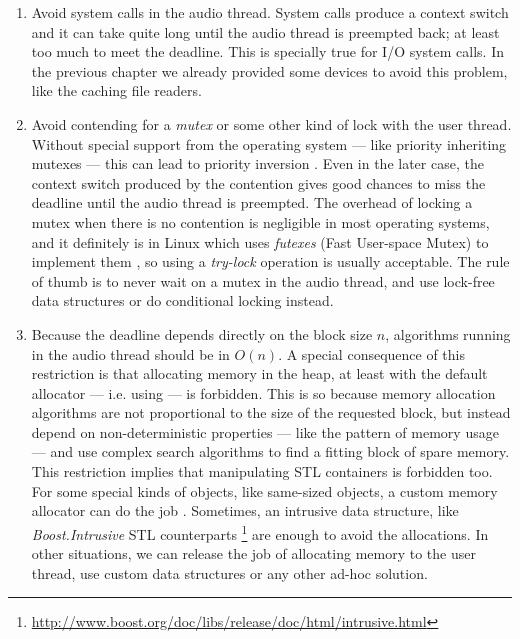 \begin{enumerate}

\item Avoid system calls in the audio thread. System calls produce a
  context switch and it can take quite long until the audio thread is
  preempted back; at least too much to meet the deadline. This is
  specially true for I/O system calls. In the previous chapter we
  already provided some devices to avoid this problem, like the
  caching file readers.

\item Avoid contending for a \emph{mutex} or some other
  kind of lock with the user thread. Without special support from the
  operating system --- like priority inheriting mutexes --- this can
  lead to priority inversion \cite{kim03basic}. Even in the later
  case, the context switch produced by the contention gives good
  chances to miss the deadline until the audio thread is
  preempted. The overhead of locking a mutex when there is no
  contention is negligible in most operating systems, and it
  definitely is in Linux which uses \emph{futexes} (Fast User-space
  Mutex) to implement them \cite{franke02futex}, so using a
  \emph{try-lock} operation is usually acceptable. The rule of thumb
  is to never wait on a mutex in the audio thread, and use lock-free
  data structures \cite{valois96lockfree} or do conditional locking
  instead.

\item Because the deadline depends directly on the block size $n$,
  algorithms running in the audio thread should be
  in $O(n)$. A special consequence of this restriction is that
  allocating memory in the heap, at least with
  the default allocator --- i.e. using  --- is
  forbidden. This is so because memory allocation algorithms are not
  proportional to the size of the requested block, but instead depend
  on non-deterministic properties --- like the pattern of memory usage
  --- and use complex search algorithms to find a fitting block of
  spare memory. This restriction implies that manipulating STL
  containers is forbidden too. For some special kinds of objects, like
  same-sized objects, a custom memory allocator can do the job
  \cite{alexandrescu01modern}. Sometimes, an intrusive data structure,
  like \emph{Boost.Intrusive} STL counterparts
  \footnote{\url{http://www.boost.org/doc/libs/release/doc/html/intrusive.html}}
  are enough to avoid the allocations. In other situations, we can
  release the job of allocating memory to the user thread, use custom
  data structures or any other ad-hoc solution.
\end{enumerate}

